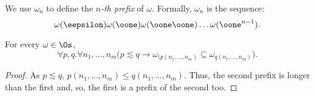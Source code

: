 \begin{defn}[Prefix]
We use $\omega_{n}$ to define
the \emph{$n$-th prefix} of $\omega$.
Formally, $\omega_{n}$ is the sequence:
$$
\omega(\eepsilon)\omega(\oone) \omega(\oone\oone)
\dots \omega(\oone^{n-1}).
$$
\end{defn}


\begin{lemma}\label{SFPlemma13}
For every $\omega\in \Os$,
$$
\forall p,q.\forall n_1,\dots, n_m(p \lesssim q \rightarrow
\omega_{(p(n_1,\dots, n_m)} \subseteq
\omega_{q(n_1,\dots, n_m)}\big).
$$
\end{lemma}
\begin{proof}
As $p\lesssim q$, $p(n_1,\dots, n_m)\leq
q(n_1,\dots, n_m)$.
Thus, the second prefix is longer than the first and, so,
the first is a prefix of the second too.
\end{proof}



